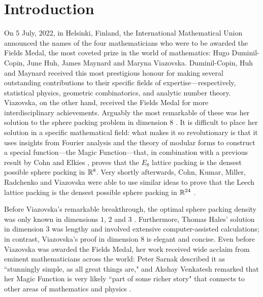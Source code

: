 \chapter{Introduction}
\thispagestyle{empty}

On 5 July, 2022, in Helsinki, Finland, the International Mathematical Union announced the names of the four mathematicians who were to be awarded the Fields Medal, the most coveted prize in the world of mathematics: Hugo Duminil-Copin, June Huh, James Maynard and Maryna Viazovska. Duminil-Copin, Huh and Maynard received this most prestigious honour for making several outstanding contributions to their specific fields of expertise---respectively, statistical physics, geometric combinatorics, and analytic number theory. Viazovska, on the other hand, received the Fields Medal for more interdisciplinary achievements. Arguably the most remarkable of these was her solution to the sphere packing problem in dimension 8 \cite{Viazovska8}. It is difficult to place her solution in a specific mathematical field: what makes it so revolutionary is that it uses insights from Fourier analysis and the theory of modular forms to construct a special function---the Magic Function---that, in combination with a previous result by Cohn and Elkies \cite{CohnElkies}, proves that the $E_8$ lattice packing is the densest possible sphere packing in $\mathbb{R}^8$. Very shortly afterwards, Cohn, Kumar, Miller, Radchenko and Viazovska were able to use similar ideas to prove that the Leech lattice packing is the densest possible sphere packing in $\mathbb{R}^{24}$ \cite{Viazovska24}.

Before Viazovska's remarkable breakthrough, the optimal sphere packing density was only known in dimensions $1$, $2$ and $3$ \cite{CohnOnViazovska}. Furthermore, Thomas Hales' solution in dimension $3$ \cite{HalesKeplerInformal} was lengthy and involved extensive computer-assisted calculations; in contrast, Viazovska's proof in dimension $8$ is elegant and concise. Even before Viazovska was awarded the Fields Medal, her work received wide acclaim from eminent mathematicians across the world: Peter Sarnak described it as ``stunningly simple, as all great things are," and Akshay Venkatesh remarked that her Magic Function is very likely ``part of some richer story" that connects to other areas of mathematics and physics \cite{QuantaPiece}.






